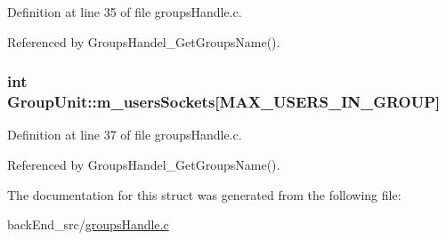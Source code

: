 Definition at line 35 of file groups\+Handle.\+c.



Referenced by Groups\+Handel\+\_\+\+Get\+Groups\+Name().

\subsubsection[{\texorpdfstring{m\+\_\+users\+Sockets}{m_usersSockets}}]{\setlength{\rightskip}{0pt plus 5cm}int Group\+Unit\+::m\+\_\+users\+Sockets\mbox{[}{\bf M\+A\+X\+\_\+\+U\+S\+E\+R\+S\+\_\+\+I\+N\+\_\+\+G\+R\+O\+UP}\mbox{]}}\hypertarget{structGroupUnit_a4c0b8c3b8b06c8fc45883f5ab017b55c}{}\label{structGroupUnit_a4c0b8c3b8b06c8fc45883f5ab017b55c}


Definition at line 37 of file groups\+Handle.\+c.



Referenced by Groups\+Handel\+\_\+\+Get\+Groups\+Name().



The documentation for this struct was generated from the following file\+:\begin{DoxyCompactItemize}
\item 
back\+End\+\_\+src/\hyperlink{groupsHandle_8c}{groups\+Handle.\+c}\end{DoxyCompactItemize}
